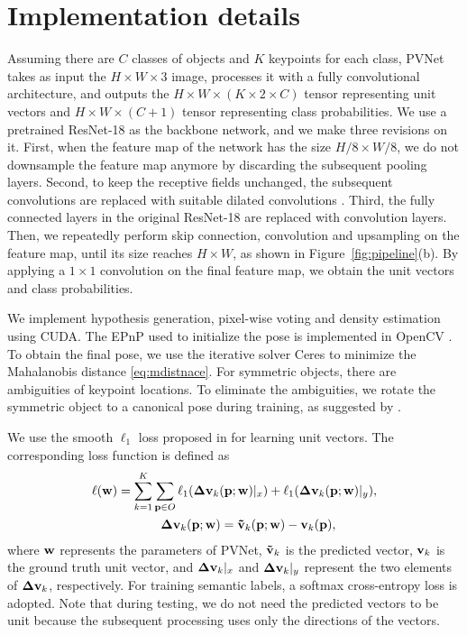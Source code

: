 \documentclass[10pt,twocolumn,letterpaper]{article}
\begin{document}
\section{Implementation details}
Assuming there are $C$ classes of objects and $K$ keypoints for each class, PVNet takes as input the $H\times W\times 3$ image, processes it with a fully convolutional architecture, and outputs the $H\times W\times (K\times 2\times C)$ tensor representing unit vectors and $H\times W \times (C+1)$ tensor representing class probabilities. We use a pretrained ResNet-18 \cite{he2016deep} as the backbone network, and we make three revisions on it. First, when the feature map of the network has the size $H/8\times W/8$, we do not downsample the feature map anymore by discarding the subsequent pooling layers. Second, to keep the receptive fields unchanged, the subsequent convolutions are replaced with suitable dilated convolutions \cite{YuKoltun2016}. Third, the fully connected layers in the original ResNet-18 are replaced with convolution layers. 
Then, we repeatedly perform skip connection, convolution and upsampling on the feature map, until its size reaches $H \times W$, as shown in Figure~\ref{fig:pipeline}(b). 
By applying a $1 \times 1$ convolution on the final feature map, we obtain the unit vectors and class probabilities.

We implement hypothesis generation, pixel-wise voting and density estimation using CUDA. The EPnP \cite{lepetit2009epnp} used to initialize the pose is implemented in OpenCV \cite{bradski2000opencv}. To obtain the final pose, we use the iterative solver Ceres \cite{ceres-solver} to minimize the Mahalanobis distance \eqref{eq:mdistnace}. For symmetric objects, there are ambiguities of keypoint locations. To eliminate the ambiguities, we rotate the symmetric object to a canonical pose during training, as suggested by \cite{rad2017bb8}.


We use the smooth $\ell_1$ loss proposed in \cite{girshick2015fast} for learning unit vectors. The corresponding loss function is defined as
\begin{align}
    \ell({\bf w})=\sum\limits_{k=1}^K &\sum\limits_{{\bf p}\in O}^{} \ell_1({\bf \Delta v}_k({\bf p};{\bf w})|_x) + \ell_1({\bf \Delta v}_k({\bf p};{\bf w})|_y), \nonumber
    \\
    &~~{\bf \Delta v}_k({\bf p};{\bf w})={\bf \tilde{v}}_k({\bf p};{\bf w})-{\bf v}_k({\bf p}),
\end{align}
where $\bf w$ represents the parameters of PVNet, ${\bf \tilde{v}}_k$ is the predicted vector, ${\bf v}_k$ is the ground truth unit vector, and ${\bf \Delta v}_k|_x$ and ${\bf \Delta v}_k|_y$ represent the two elements of ${\bf \Delta v}_k$, respectively. For training semantic labels, a softmax cross-entropy loss is adopted. Note that during testing, we do not need the predicted vectors to be unit because the subsequent processing uses only the directions of the vectors.
\end{document}
